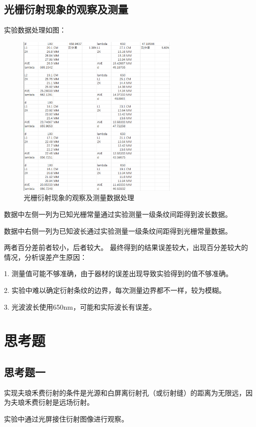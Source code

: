 \documentclass{ctexart}
\begin{document}
  \subsection{光栅衍射现象的观察及测量}
  实验数据处理如图：
  \begin{figure}[H]
    \centering
    \includegraphics[width=0.7\textwidth,height=0.8\textheight]{guangshanshujv.png}
    \caption{光栅衍射现象的观察及测量数据处理}
  \end{figure}

  数据中左侧一列为已知光栅常量通过实验测量一级条纹间距得到波长数据。

  数据中右侧一列为已知波长通过实验测量一级条纹间距得到光栅常量数据。

  两者百分差前者较小，后者较大。
  最终得到的结果误差较大，出现百分差较大的情况，分析误差产生原因：

  1.  测量值可能不够准确，由于器材的误差出现导致实验得到的值不够准确。

  2.  实验中难以确定衍射条纹的边界，每次测量边界都不一样，较为模糊。

  3.  光波波长使用650nm，可能和实际波长有误差。

\section{思考题}
  \subsection{思考题一}
  实现夫琅禾费衍射的条件是光源和白屏离衍射孔（或衍射缝）的距离为无限远，因为夫琅禾费衍射是远场衍射。

  实验中通过光屏接住衍射图像进行观察。
\end{document}
